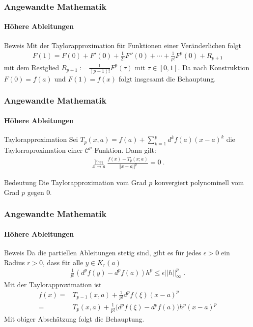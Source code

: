 \documentclass{beamer}
\begin{document}
\begin{frame}
    \frametitle{Angewandte Mathematik}
\framesubtitle{Höhere Ableitungen}
    \begin{block}{Beweis}
Mit der Taylorapproximation für Funktionen einer Veränderlichen folgt
\begin{align*}
 F(1) = F(0) + F'(0) + \frac{1}{2!} F''(0) + \cdots + \frac{1}{p!} F^p(0) + R_{p+1} 
\end{align*}
mit dem Restglied $ R_{p+1}  :=  \frac{1}{(p+1)!}  F^p(\tau)$ mit $\tau \in [0,1]$.
Da nach Konstruktion $F(0) = f(a)$ und $F(1)= f(x)$ folgt insgesamt die Behauptung.
\end{block}
 \end{frame}

\begin{frame}
    \frametitle{Angewandte Mathematik}
\framesubtitle{Höhere Ableitungen}
    \begin{block}{Taylorapproximation}
Sei $T_p(x,a) =  f(a) + \sum_{k=1}^{p} d^k f(a) (x-a)^k$ die Taylorraproximation einer $\mathcal{C}^{p}$-Funktion. Dann gilt: 
\begin{align*}
\lim_{x \to a} \frac{f(x) - T_p(x;a)}{  || x-a  ||^p} = 0 \;. 
\end{align*}
\end{block}

    \begin{block}{Bedeutung}
Die Taylorapproximation vom Grad $p$ konvergiert polynominell vom Grad $p$ gegen $0$.
\end{block}
 \end{frame}

\begin{frame}
    \frametitle{Angewandte Mathematik}
\framesubtitle{Höhere Ableitungen}
    \begin{block}{Beweis}
Da die partiellen Ableitungen stetig sind, gibt es für jedes $\epsilon > 0$ ein Radius $r >0$, dass für alle $y \in K_r(a)$
\begin{align*}
\frac{1}{p!} (d^pf(y) -d^pf(a))h^p \leq \epsilon ||h||_{\infty}^p \; . 
\end{align*}
Mit der Taylorapproximation ist 
\begin{align*}
f(x) = & T_{p-1}(x, a) +  \frac{1}{p!} d^{p}f(\xi) (x-a)^{p} \\
 = & T_p(x,a) +   \frac{1}{p!} \bigl( d^pf(\xi) -d^pf(a) \bigr) h^p (x-a)^p
\end{align*} 
Mit obiger Abschätzung folgt die Behauptung.
\end{block}
 \end{frame}
\end{document}

